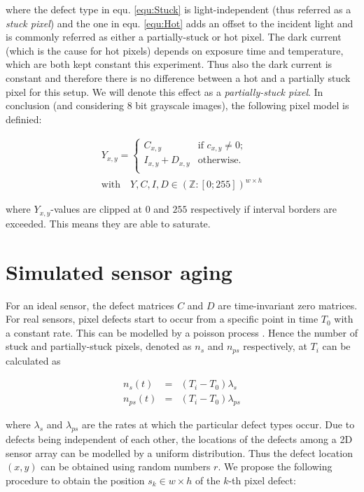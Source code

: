 \documentclass[10pt,twocolumn,letterpaper]{article}
\begin{document}
where the defect type in equ. \ref{equ:Stuck} is light-independent (thus referred as a \emph{stuck pixel}) and the one in equ. \ref{equ:Hot} adds an offset to the incident light and is commonly referred as either a partially-stuck or hot pixel. The dark current (which is the cause for hot pixels) depends on exposure time and temperature, which are both kept constant this experiment. Thus also the dark current is constant and therefore there is no difference between a hot and a partially stuck pixel for this setup. We will denote this effect as a \emph{partially-stuck pixel}. In conclusion (and considering 8 bit grayscale images), the following pixel model is definied:

\begin{equation}
\begin{aligned}
Y_{x,y} = \begin{cases}
C_{x,y}  & \text{if $c_{x,y} \neq 0$}; \\
I_{x,y} +D_{x,y}  & \text{otherwise}.\\
\end{cases} \\ \text{with} \quad Y,C,I,D \in {(\mathbb{Z}:[0;255])}^{w \times h}
\label{equ:finalPixelModel}
\end{aligned} 
\end{equation}

where $Y_{x,y}$-values are clipped at $0$ and $255$ respectively if interval borders are exceeded. This means they are able to saturate. 

\section{Simulated sensor aging}
\label{virtualAging}
For an ideal sensor, the defect matrices $C$ and $D$ are time-invariant zero matrices. For real sensors, pixel defects start to occur from a specific point in time $T_0$ with a constant rate. This can be modelled by a poisson process \cite{fridrich}. Hence the number of stuck and partially-stuck pixels, denoted as $n_{s}$ and $n_{ps}$ respectively, at $T_i$ can be calculated as

\begin{eqnarray}
   n_s(t)  & = & (T_i-T_0) \lambda_s \\
  n_{ps}(t) & = &  (T_i-T_0) \lambda_{ps}
\end{eqnarray}

where $\lambda_s$ and $\lambda_{ps}$ are the rates at which the particular defect types occur. Due to defects being independent of each other, the locations of the defects among a 2D sensor array can be modelled by a uniform distribution. Thus the defect location $(x,y)$ can be obtained using random numbers $r$. We propose the following procedure to obtain the position $s_k \in {w \times h}$ of the $k$-th pixel defect:
\end{document}
